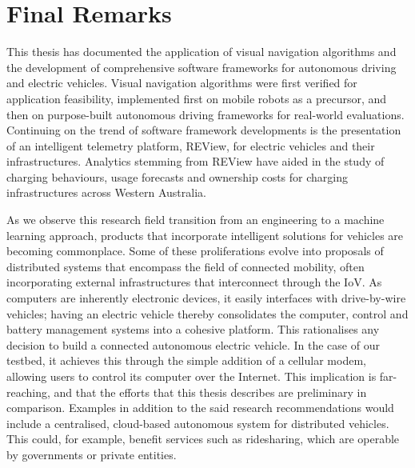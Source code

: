 
\section{Final Remarks}
This thesis has documented the application of visual navigation algorithms and the development of comprehensive software frameworks for autonomous driving and electric vehicles. Visual navigation algorithms were first verified for application feasibility, implemented first on mobile robots as a precursor, and then on purpose-built autonomous driving frameworks for real-world evaluations. Continuing on the trend of software framework developments is the presentation of an intelligent telemetry platform, REView, for electric vehicles and their infrastructures. Analytics stemming from REView have aided in the study of charging behaviours, usage forecasts and ownership costs for charging infrastructures across Western Australia.

As we observe this research field transition from an engineering to a machine learning approach, products that incorporate intelligent solutions for vehicles are becoming commonplace. Some of these proliferations evolve into proposals of distributed systems that encompass the field of connected mobility, often incorporating external infrastructures that interconnect through the IoV. As computers are inherently electronic devices, it easily interfaces with drive-by-wire vehicles; having an electric vehicle thereby consolidates the computer, control and battery management systems into a cohesive platform. This rationalises any decision to build a connected autonomous electric vehicle. In the case of our testbed, it achieves this through the simple addition of a cellular modem, allowing users to control its computer over the Internet. This implication is far-reaching, and that the efforts that this thesis describes are preliminary in comparison. Examples in addition to the said research recommendations would include a centralised, cloud-based autonomous system for distributed vehicles. This could, for example, benefit services such as ridesharing, which are operable by governments or private entities. 


